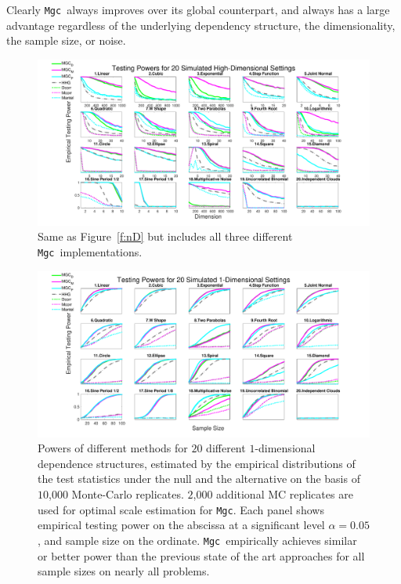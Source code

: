 \documentclass[11pt]{article}
\providecommand{\sct}[1]{{\sc \texttt{#1}}}
\newcommand{\Mgc}{\sct{Mgc}}
\begin{document}
Clearly \Mgc~always improves over its global counterpart, and always has a large advantage regardless of the underlying dependency structure, the dimensionality, the sample size, or noise.

\begin{figure}[htbp]
\includegraphics[width=1.0\textwidth]{../Figures/FigHDPowerAll}
\caption{
Same as Figure~\ref{f:nD} but includes all three different \Mgc~implementations.}
\label{f:nDAll}
\end{figure}

\begin{figure}[htbp]
\includegraphics[width=1.0\textwidth]{../Figures/Fig1DPowerAll}
\caption{
Powers of different methods for $20$ different $1$-dimensional dependence structures, estimated by the empirical distributions of the test statistics under the null and the alternative on the basis of $10$,$000$ Monte-Carlo replicates. $2$,$000$ additional MC replicates are used for optimal scale estimation for \Mgc.
Each panel shows empirical testing power on the abscissa at a significant level $\alpha=0.05$, and sample size on the ordinate.
\Mgc~empirically achieves similar or better power than the previous state of the art approaches for all sample sizes on nearly all problems.}
\label{f:1DAll}
\end{figure}
\end{document}

